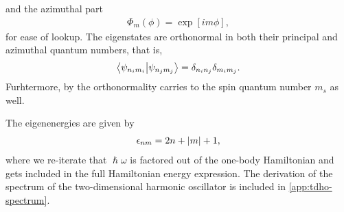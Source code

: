             and the azimuthal part
            \begin{align}
                \Phi_{m}(\phi) = \exp[i m \phi],
            \end{align}
            for ease of lookup.
            The eigenstates are orthonormal in both their principal and
            azimuthal quantum numbers, that is,
            \begin{align}
                \braket{\psi_{n_i m_i}}{\psi_{n_j m_j}}
                = \delta_{n_i n_j}\delta_{m_i m_j}.
            \end{align}
            Furhtermore, by the orthonormality carries to the spin quantum
            number $m_s$ as well.

            The eigenenergies are given by
            \begin{align}
                \epsilon_{nm}
                = 2n + \abs{m} + 1,
                \label{eq:eigenenergy-tdho}
            \end{align}
            where we re-iterate that $\hslash\omega$ is factored out of the
            one-body Hamiltonian and gets included in the full Hamiltonian
            energy expression.
            The derivation of the spectrum of the two-dimensional harmonic
            oscillator is included in \autoref{app:tdho-spectrum}.

